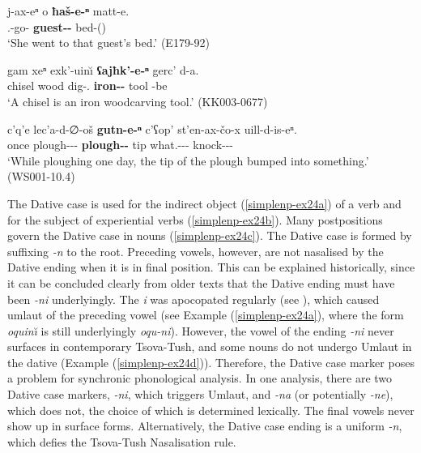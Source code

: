 \begin{exe}
	\ex\label{simplenp-ex23}
	\begin{xlist}
		
		   
			\ex\label{simplenp-ex23a}
			\gll j-ax-eⁿ o \textbf{ħaš-e-ⁿ} matt-e. \\
			{\F}.{\Sg}-go-{\Aor} {\Dist} \textbf{guest-{\Obl}-{\Gen}} bed-{\Obl}({\Ess}) \\
			\trans `She went to that guest's bed.'
			\hfill (E179-92)
		   
		
		   
			\ex\label{simplenp-ex23b}
			\gll gam xeⁿ exk'-uin\u{\i} \textbf{ʕajħk'-e-ⁿ} gerc' d-a. \\
			chisel wood dig-{\Ptcp}.{\Npst} \textbf{iron-{\Obl}-{\Gen}} tool {\D}-be \\
			\trans `A chisel is an iron woodcarving tool.'
			\hfill (KK003-0677)
		
		
		
			\ex\label{simplenp-ex23c}
			\gll c'q'e lec'a-d-∅-oš \textbf{gutn-e-ⁿ} c'ʕop' st'en-ax-čo-x uill-d-is-eⁿ. \\
			once plough-{\D}-{\Tr}-{\Simul} \textbf{plough-{\Obl}-{\Gen}} tip what.{\Obl}-{\Indf}-{\Obl}-{\Cont} knock-{\D}-{\Lv}-{\Aor} \\
			\trans `While ploughing one day, the tip of the plough bumped into something.'
			\hfill (WS001-10.4)
		
		
	\end{xlist}
\end{exe}

The Dative case is used for the indirect object (\ref{simplenp-ex24a}) of a verb and for the subject of experiential verbs (\ref{simplenp-ex24b}). Many postpositions govern the Dative case in nouns (\ref{simplenp-ex24c}). The Dative case is formed by suffixing \textit{-n} to the root. Preceding vowels, however, are not nasalised by the Dative ending when it is in final position. This can be explained historically, since it can be concluded clearly from older texts that the Dative ending must have been \textit{-ni} underlyingly. The \textit{i} was apocopated regularly (see ), which caused umlaut of the preceding vowel (see Example (\ref{simplenp-ex24a}), where the form \textit{oquin\u{\i}} is still underlyingly \textit{oqu-ni}). However, the vowel of the ending \textit{-ni} never surfaces in contemporary Tsova-Tush, and some nouns do not undergo Umlaut in the dative (Example (\ref{simplenp-ex24d})). Therefore, the Dative case marker poses a problem for synchronic phonological analysis. In one analysis, there are two Dative case markers, \textit{-ni}, which triggers Umlaut, and \textit{-na} (or potentially \textit{-ne}), which does not, the choice of which is determined lexically. The final vowels never show up in surface forms. Alternatively, the Dative case ending is a uniform \textit{-n}, which defies the Tsova-Tush Nasalisation rule.

